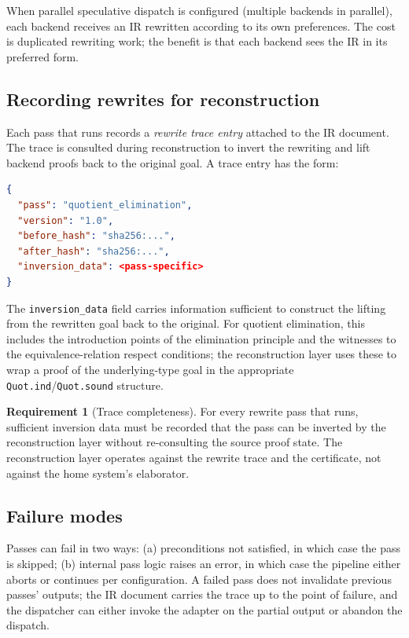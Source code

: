 \documentclass[11pt,letterpaper]{article}
\theoremstyle{definition}
\newtheorem{requirement}{Requirement}[section]
\theoremstyle{remark}
\begin{document}
When parallel speculative dispatch is configured (multiple backends in
parallel), each backend receives an IR rewritten according to its own
preferences. The cost is duplicated rewriting work; the benefit is that
each backend sees the IR in its preferred form.

\subsection{Recording rewrites for reconstruction}

Each pass that runs records a \emph{rewrite trace entry} attached to the
IR document. The trace is consulted during reconstruction to invert the
rewriting and lift backend proofs back to the original goal. A trace
entry has the form:

\begin{lstlisting}[language=json]
{
  "pass": "quotient_elimination",
  "version": "1.0",
  "before_hash": "sha256:...",
  "after_hash": "sha256:...",
  "inversion_data": <pass-specific>
}
\end{lstlisting}

The \texttt{inversion\_data} field carries information sufficient to
construct the lifting from the rewritten goal back to the original. For
quotient elimination, this includes the introduction points of the
elimination principle and the witnesses to the equivalence-relation
respect conditions; the reconstruction layer uses these to wrap a
proof of the underlying-type goal in the appropriate
\texttt{Quot.ind}/\texttt{Quot.sound} structure.

\begin{requirement}[Trace completeness]
For every rewrite pass that runs, sufficient inversion data must be
recorded that the pass can be inverted by the reconstruction layer
without re-consulting the source proof state. The reconstruction layer
operates against the rewrite trace and the certificate, not against the
home system's elaborator.
\end{requirement}

\subsection{Failure modes}

Passes can fail in two ways: (a) preconditions not satisfied, in which
case the pass is skipped; (b) internal pass logic raises an error, in
which case the pipeline either aborts or continues per configuration.
A failed pass does not invalidate previous passes' outputs; the IR
document carries the trace up to the point of failure, and the
dispatcher can either invoke the adapter on the partial output or
abandon the dispatch.
\end{document}
